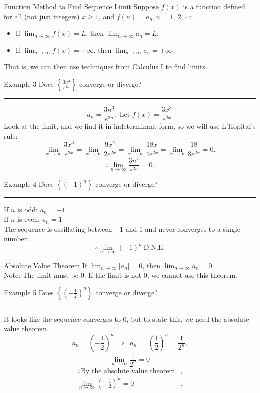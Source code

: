 \documentclass[12pt,a4paper]{article}
\def\DNE{\mathrm{D.N.E.}}
\begin{document}
\begin{thm}{Function Method to Find Sequence Limit}
	Suppose $f(x)$ is a function defined for all (not just integers) $x\geq 1$, and $f(n)=a_n, n=1,\ 2,\cdots$: 
	\begin{itemize}
		\item If $\displaystyle\lim_{n\to\infty}f(x)=L$, then $\displaystyle\lim_{n\to\infty}a_n=L$;
		\item If $\displaystyle\lim_{n\to\infty}f(x)=\pm\infty$, then $\displaystyle\lim_{n\to\infty}a_n=\pm\infty$.
	\end{itemize}
	That is, we can then use techniques from Calculus I to find limits. 
\end{thm}
\begin{eg}{Example 3}
	Does $\displaystyle\left\{\frac{3n^3}{e^{2n}}\right\}$ converge or diverge? \\
	\noindent\rule[0.25\baselineskip]{\textwidth}{1pt}
	$$a_n=\frac{3n^3}{e^{2n}},\ \text{Let }f(x)=\frac{3x^3}{e^{2x}}$$
	Look at the limit, and we find it in indeterminant form, so we will use L'Hopital's rule: 
	$$\lim_{x\to\infty}\frac{3x^3}{e^{2x}}=\lim_{x\to\infty}\frac{9x^2}{2e^{2x}}=\lim_{x\to\infty}\frac{18x}{4e^{2x}}=\lim_{x\to\infty}\frac{18}{8e^{2x}}=0.$$
	$$\therefore\lim_{n\to\infty}\frac{3n^3}{e^{2n}}=0.$$
\end{eg}
\begin{eg}{Example 4}
	Does $\left\{(-1)^n\right\}$ converge or diverge? \\
	\noindent\rule[0.25\baselineskip]{\textwidth}{1pt}
	If $n$ is odd: $a_n=-1$\\
	If $n$ is even: $a_n=1$\\
	The sequence is oscillating between $-1$ and $1$ and never converges to a single number. 
	$$\therefore\lim_{n\to\infty}(-1)^n\ \DNE$$
\end{eg}
\begin{thm}{Absolute Value Theorem}
	If $\displaystyle\lim_{n\to\infty}\left|a_n\right|=0$, then 	$\displaystyle\lim_{n\to\infty}a_n=0.$\\
	Note: The limit must be $0$. If the limit is not $0$, we cannot use this theorem.
\end{thm}
\begin{eg}{Example 5}
	Does $\displaystyle\left\{\left(-\frac{1}{2}\right)^n\right\}$ converge or diverge? \\
	\noindent\rule[0.25\baselineskip]{\textwidth}{1pt}
	It looks like the sequence converges to $0$, but to state this, we need the absolute value theorem. 
	$$a_n=\left(-\frac{1}{2}\right)^n\ \Rightarrow\ \left|a_n\right|=\left(\frac{1}{2}\right)^n=\frac{1}{2^n}.$$
	$$\lim_{n\to\infty}\frac{1}{2^n}=0$$
	$$\begin{aligned}
		\therefore\text{By the absolute value theorem}&,\\
		\lim_{n\to\infty}\left(-\frac{1}{2}\right)^n=0&.
	\end{aligned}$$
\end{eg}
\end{document}
